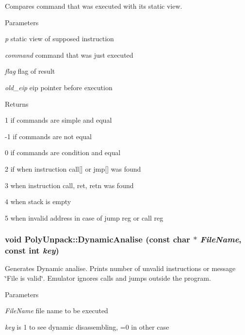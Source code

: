 \label{classPolyUnpack_a70dca9f1f731890af945b5070d9bdb0b}
Compares command that was executed with its static view. 
\begin{DoxyParams}{Parameters}
\item[{\em p}]static view of supposed instruction \item[{\em command}]command that was just executed \item[{\em flag}]flag of result \item[{\em old\_\-eip}]eip pointer before execution \end{DoxyParams}
\begin{DoxyReturn}{Returns}

\begin{DoxyItemize}
\item 1 if commands are simple and equal 
\item -\/1 if commands are not equal 
\item 0 if commands are condition and equal 
\item 2 if when instruction call\mbox{[}\mbox{]} or jmp\mbox{[}\mbox{]} was found 
\item 3 when instruction call, ret, retn was found 
\item 4 when stack is empty 
\item 5 when invalid address in case of jump reg or call reg 
\end{DoxyItemize}
\end{DoxyReturn}
\hypertarget{classPolyUnpack_a7258cb80115be67044a9442086b19bc6}{
\subsubsection[{DynamicAnalise}]{\setlength{\rightskip}{0pt plus 5cm}void PolyUnpack::DynamicAnalise (const char $\ast$ {\em FileName}, \/  const int {\em key})}}
\label{classPolyUnpack_a7258cb80115be67044a9442086b19bc6}
Generates Dynamic analise. Prints number of unvalid instructions or message \char`\"{}File is valid\char`\"{}. Emulator ignores calls and jumps outside the program.


\begin{DoxyParams}{Parameters}
\item[{\em FileName}]file name to be executed \item[{\em key}]is 1 to see dynamic disassembling, =0 in other case \end{DoxyParams}


